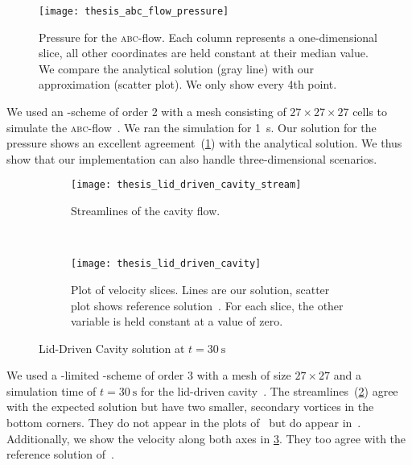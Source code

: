 \begin{figure}[htb]
  \centering
  \texttt{[image: thesis\_abc\_flow\_pressure]}
  \caption{\label{fig:abc-result}%
  Pressure for the \textsc{abc}-flow.
  Each column represents a one-dimensional slice, all other coordinates are held constant at their median value.
  We compare the analytical solution (gray line) with our approximation (scatter plot).
  We only show every 4th point.}
\end{figure}
We used an \aderdg{}-scheme of order 2 with a mesh consisting of $27 \times 27 \times 27$ cells to simulate the \textsc{abc}-flow~.
We ran the simulation for \SI{1}{\s}.
Our solution for the pressure shows an excellent agreement~(\cref{fig:abc-result}) with the analytical solution.
We thus show that our implementation can also handle three-dimensional scenarios.

\begin{figure}[htb]
  \centering
  \begin{subfigure}[t]{0.5\textwidth}
    \centering
    \texttt{[image: thesis\_lid\_driven\_cavity\_stream]}
    \caption{\label{fig:lid-driven-cavity-streamlines}%
      Streamlines of the cavity flow.}
  \end{subfigure}~%
  \begin{subfigure}[t]{0.5\textwidth}
    \centering
    \texttt{[image: thesis\_lid\_driven\_cavity]}
    \caption{\label{fig:lid-driven-cavity-result}%
      Plot of velocity slices. Lines are our solution, scatter plot shows reference solution~\cite{ghia1982high}.
      For each slice, the other variable is held constant at a value of zero.}
  \end{subfigure}
  
  \caption{\label{fig:lid-driven-cavity}%
    Lid-Driven Cavity solution at $t=\SI{30}{\s}$}
  
\end{figure}
We used a \muscl{}-limited \aderdg{}-scheme of order 3 with a mesh of size $27 \times 27$ and a simulation time of $t = \SI{30}{\s}$ for the lid-driven cavity~.
The streamlines~(\cref{fig:lid-driven-cavity-streamlines}) agree with the expected solution but have two smaller, secondary vortices in the bottom corners.
They do not appear in the plots of~\cite{dumbser2010arbitrary} but do appear in~\cite{ghia1982high}.
Additionally, we show the velocity along both axes in \cref{fig:lid-driven-cavity-result}.
They too agree with the reference solution of~\cite{ghia1982high}.

